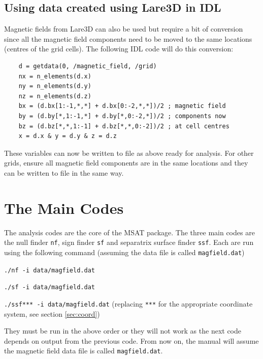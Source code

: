 \documentclass[12pt]{article}
\begin{document}
    \subsection{Using data created using Lare3D in IDL}

      Magnetic fields from Lare3D can also be used but require a bit of conversion since all the magnetic field components need to be moved to the same locations (centres of the grid cells). The following IDL code will do this conversion:

      \begin{verbatim}
    d = getdata(0, /magnetic_field, /grid)
    nx = n_elements(d.x)
    ny = n_elements(d.y)
    nz = n_elements(d.z)
    bx = (d.bx[1:-1,*,*] + d.bx[0:-2,*,*])/2 ; magnetic field
    by = (d.by[*,1:-1,*] + d.by[*,0:-2,*])/2 ; components now
    bz = (d.bz[*,*,1:-1] + d.bz[*,*,0:-2])/2 ; at cell centres
    x = d.x & y = d.y & z = d.z
      \end{verbatim}

      These variables can now be written to file as above ready for analysis. For other grids, ensure all magnetic field components are in the same locations and they can be written to file in the same way.

  \section{The Main Codes}

    The analysis codes are the core of the MSAT package. The three main codes are the null finder \texttt{nf}, sign finder \texttt{sf} and separatrix surface finder \texttt{ssf}. Each are run using the following command (assuming the data file is called \texttt{magfield.dat})

    \texttt{./nf -i data/magfield.dat}

    \texttt{./sf -i data/magfield.dat}

    \texttt{./ssf*** -i data/magfield.dat} (replacing \texttt{***} for the appropriate coordinate system, see section \ref{sec:coord})

    They must be run in the above order or they will not work as the next code depends on output from the previous code. From now on, the manual will assume the magnetic field data file is called \texttt{magfield.dat}.
\end{document}
